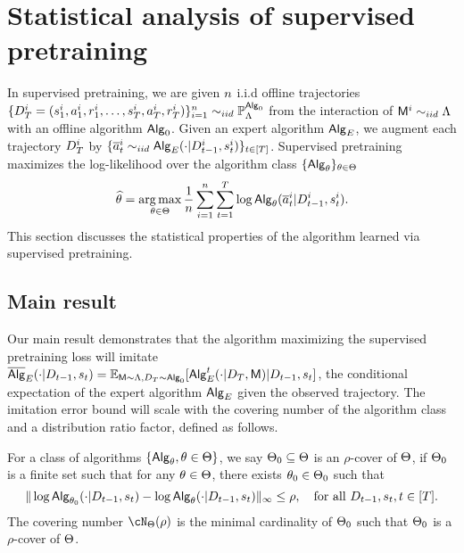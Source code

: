 \section{Statistical analysis of supervised pretraining}\label{sec:supervised-pretraining}

In supervised pretraining, we are given ${n}$ i.i.d offline trajectories $\{{D}^{i}_{T} =  ({s}^{i}_1,{a}^{i}_1, {r}^{i}_1, \ldots, {s}^{i}_{T}, \allowbreak {a}^{i}_{T}, \allowbreak{r}^{i}_{T}) \}_{i=1}^{n} \sim_{iid} \mathbb{P}_{\Lambda}^{{\mathsf{Alg}}_0}$ from the interaction of ${\mathsf{M}}^{i} \sim_{iid} {\Lambda}$ with an offline algorithm ${\mathsf{Alg}}_0$. Given an expert algorithm ${\mathsf{Alg}}_{{E}}$, we augment each trajectory ${D}_{{T}}^i$ by $\{ {\overline{a}}_t^i \sim_{iid} {\mathsf{Alg}}_{{E}}( \cdot |{D}_{t-1}^i, {s}_t^i)\}_{t \in [{T}]}$. Supervised pretraining maximizes the log-likelihood over the algorithm class $\{ {\mathsf{Alg}}_{\theta}\}_{{\theta}\in{\Theta}}$
\begin{align}
{\widehat{\theta}}=\operatorname*{arg\,max}_{{\theta}\in{\Theta}}  \frac{1}{{n}}\sum_{i=1}^{n}\sum_{t=1}^{T}\log {\mathsf{Alg}}_{\theta}({\overline{a}}^{i}_{t}|{D}_{t-1}^{i},{s}^{i}_t). \label{eq:general_mle}
\end{align}
This section discusses the statistical properties of the algorithm learned via supervised pretraining.




\subsection{Main result}



Our main result demonstrates that the algorithm maximizing the supervised pretraining loss will imitate $\overline{\mathsf{Alg}}_{{E}}(\cdot|{D}_{t-1},{s}_t) = \mathbb{E}_{{\mathsf{M}}\sim {\Lambda},  {D}_{{T}} \sim {\mathsf{Alg}}_0}[{\mathsf{Alg}}_{{E}}^t(\cdot|{D}_{T},{\mathsf{M}})|{D}_{t-1},{s}_t]$, the conditional expectation of the expert algorithm ${\mathsf{Alg}}_{{E}}$ given the observed trajectory. The imitation error bound will scale with the covering number of the algorithm class and a  distribution ratio factor, defined as follows.

\begin{definition}\label{def:cover_number_general} For a class of algorithms $\{{\mathsf{Alg}}_{\theta},{\theta}\in{\Theta}\}$,
we say ${\Theta}_0 \subseteq{\Theta}$ is an  $\rho$-cover of ${\Theta}$, if ${\Theta}_0$ is a finite set such that for any ${\theta}\in{\Theta}$, there exists ${\theta}_0\in{\Theta}_0$ such that
\[
\|\log {\mathsf{Alg}}_{{\theta}_0}(\cdot|{D}_{t-1},{s}_t)-\log {\mathsf{Alg}}_{{\theta}}(\cdot|{D}_{t-1},{s}_t)\|_{\infty}\leq\rho,~~~ \text{for all } {D}_{t-1},{s}_t, t\in[{T}].
\]
The covering number $\cN_{\Parspace}(\rho)$ is the minimal cardinality of ${\Theta}_0$ such that ${\Theta}_0$ is a $\rho$-cover of ${\Theta}$.
\end{definition}








